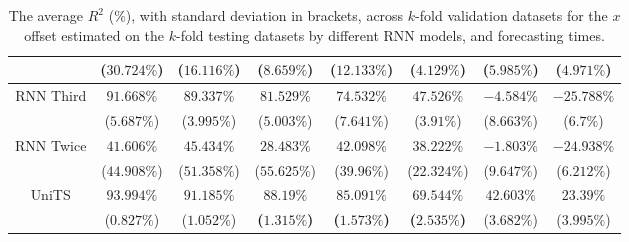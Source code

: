 \begin{table}[!ht]
{\begin{tabular}{|c|c|c|c|c|c|c|c|}
			 & ($30.724\%$) & ($16.116\%$) & ($8.659\%$) & ($12.133\%$) & ($4.129\%$) & ($5.985\%$) & ($4.971\%$) \\ \hline
			\multirow{2}{*}{RNN Third} & $91.668\%$ & $89.337\%$ & $81.529\%$ & $74.532\%$ & $47.526\%$ & $-4.584\%$ & $-25.788\%$ \\
			 & ($5.687\%$) & ($3.995\%$) & ($5.003\%$) & ($7.641\%$) & ($3.91\%$) & ($8.663\%$) & ($6.7\%$) \\ \hline
			\multirow{2}{*}{RNN Twice} & $41.606\%$ & $45.434\%$ & $28.483\%$ & $42.098\%$ & $38.222\%$ & $-1.803\%$ & $-24.938\%$ \\
			 & ($44.908\%$) & ($51.358\%$) & ($55.625\%$) & ($39.96\%$) & ($22.324\%$) & ($9.647\%$) & ($6.212\%$) \\ \hline
			\multirow{2}{*}{UniTS} & $93.994\%$ & $91.185\%$ & $\mathbf{88.19\%}$ & $\mathbf{85.091\%}$ & $\mathbf{69.544\%}$ & $42.603\%$ & $23.39\%$ \\
			 & ($0.827\%$) & ($1.052\%$) & \textbf{(}$\mathbf{1.315\%}$\textbf{)} & \textbf{(}$\mathbf{1.573\%}$\textbf{)} & \textbf{(}$\mathbf{2.535\%}$\textbf{)} & ($3.682\%$) & ($3.995\%$) \\ \hline
		\end{tabular}
	}
	\caption{The average $R^{2}$ (\%), with standard deviation in brackets, across $k$-fold validation datasets for the $x$ offset estimated on the $k$-fold testing datasets by different RNN models, and forecasting times.}
	\label{tab:all_longitude_no_abs_R2}
\end{table}

